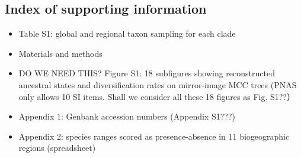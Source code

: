 \subsection{Index of supporting information}

\begin{itemize}
\item Table S1: global and regional taxon sampling for each clade
\item Materials and methods
\item DO WE NEED THIS? Figure S1: 18 subfigures showing reconstructed ancestral states and diversification rates on mirror-image MCC trees (PNAS only allows 10 SI items. Shall we consider all these 18 figures as Fig. S1??）
\item Appendix 1: Genbank accession numbers (Appendix S1???)
\item Appendix 2: species ranges scored as presence-absence in 11 biogeographic regions (spreadsheet)
\end{itemize}